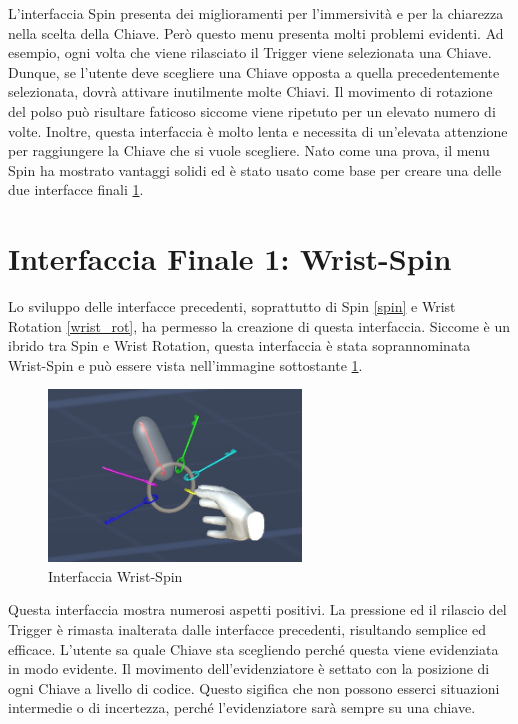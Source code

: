 \documentclass[target=bach,aauheader=]{thud}
\begin{document}
L'interfaccia Spin presenta dei miglioramenti per l'immersività e per la chiarezza nella scelta della Chiave.
Però questo menu presenta molti problemi evidenti.
Ad esempio, ogni volta che viene rilasciato il Trigger viene selezionata una Chiave.
Dunque, se l'utente deve scegliere una Chiave opposta a quella precedentemente selezionata, dovrà attivare inutilmente molte Chiavi. 
Il movimento di rotazione del polso può risultare faticoso siccome viene ripetuto per un elevato numero di volte.
Inoltre, questa interfaccia è molto lenta e necessita di un'elevata attenzione per raggiungere la Chiave che si vuole scegliere.
Nato come una prova, il menu Spin ha mostrato vantaggi solidi ed è stato usato come base per creare una delle due interfacce finali \ref{int_wrist-spin}.  

\section{Interfaccia Finale 1: Wrist-Spin} %
\label{int_wrist-spin}
Lo sviluppo delle interfacce precedenti, soprattutto di Spin \ref{spin} e Wrist Rotation \ref{wrist_rot}, ha permesso la creazione di questa interfaccia.
Siccome è un ibrido tra Spin e Wrist Rotation, questa interfaccia è stata soprannominata Wrist-Spin e può essere vista nell'immagine sottostante \ref{fig:wrist_spin}.

\begin{figure}[h]
    \centering
    \includegraphics[width=0.60\textwidth]{wrist_spin}
    \caption{Interfaccia Wrist-Spin}
    \label{fig:wrist_spin}
\end{figure}

Questa interfaccia mostra numerosi aspetti positivi.
La pressione ed il rilascio del Trigger è rimasta inalterata dalle interfacce precedenti, risultando semplice ed efficace.
L'utente sa quale Chiave sta scegliendo perché questa viene evidenziata in modo evidente.
Il movimento dell'evidenziatore è settato con la posizione di ogni Chiave a livello di codice. 
Questo sigifica che non possono esserci situazioni intermedie o di incertezza, perché l'evidenziatore sarà sempre su una chiave.
\end{document}
